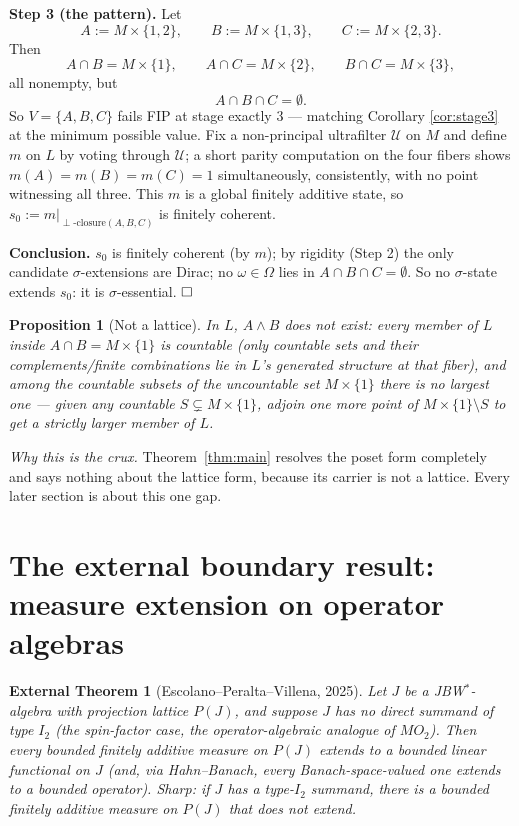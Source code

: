 \documentclass[11pt]{article}
\newtheorem{proposition}[theorem]{Proposition}
\newtheorem{extthm}[theorem]{External Theorem}
\theoremstyle{remark}
\begin{document}
\smallskip
\noindent\textbf{Step 3 (the pattern).} Let
\[
  A := M\times\{1,2\},\qquad B := M\times\{1,3\},\qquad C := M\times\{2,3\}.
\]
Then
\[
  A\cap B = M\times\{1\},\qquad A\cap C = M\times\{2\},\qquad B\cap C =
  M\times\{3\},
\]
all nonempty, but
\[
  A\cap B\cap C = \emptyset.
\]
So $V=\{A,B,C\}$ fails FIP at stage exactly $3$ — matching Corollary
\ref{cor:stage3} at the minimum possible value. Fix a non-principal
ultrafilter $\mathcal U$ on $M$ and define $m$ on $L$ by voting through
$\mathcal U$; a short parity computation on the four fibers shows $m(A)=m(B)=
m(C)=1$ simultaneously, consistently, with no point witnessing all three.
This $m$ is a global finitely additive state, so $s_0 := m|_{\perp
\text{-closure}(A,B,C)}$ is finitely coherent.

\smallskip
\noindent\textbf{Conclusion.} $s_0$ is finitely coherent (by $m$); by
rigidity (Step 2) the only candidate $\sigma$-extensions are Dirac; no
$\omega\in\Omega$ lies in $A\cap B\cap C=\emptyset$. So no $\sigma$-state
extends $s_0$: it is $\sigma$-essential. $\hfill\square$

\begin{proposition}[Not a lattice]
\label{prop:not-lattice}
In $L$, $A\wedge B$ does not exist: every member of $L$ inside $A\cap B =
M\times\{1\}$ is countable (only countable sets and their complements/finite
combinations lie in $L$'s generated structure at that fiber), and among the
countable subsets of the uncountable set $M\times\{1\}$ there is no largest
one — given any countable $S\subsetneq M\times\{1\}$, adjoin one more point
of $M\times\{1\}\setminus S$ to get a strictly larger member of $L$.
\end{proposition}

\emph{Why this is the crux.} Theorem~\ref{thm:main} resolves the poset form
completely and says nothing about the lattice form, because its carrier is
not a lattice. Every later section is about this one gap.

\section{The external boundary result: measure extension on operator
algebras}

\begin{extthm}[Escolano--Peralta--Villena, 2025]
\label{thm:epv}
Let $J$ be a JBW$^\ast$-algebra with projection lattice $P(J)$, and suppose
$J$ has no direct summand of type $I_2$ (the spin-factor case, the
operator-algebraic analogue of $MO_2$). Then every bounded finitely additive
measure on $P(J)$ extends to a bounded linear functional on $J$ (and, via
Hahn--Banach, every Banach-space-valued one extends to a bounded operator).
\emph{Sharp:} if $J$ has a type-$I_2$ summand, there is a bounded finitely
additive measure on $P(J)$ that does \emph{not} extend.
\end{extthm}
\end{document}
